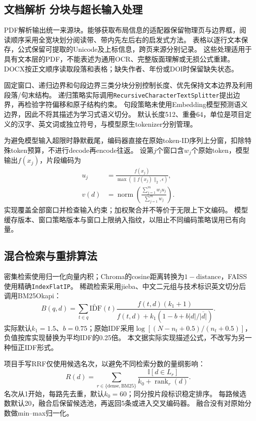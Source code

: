 \documentclass[UTF8,a4paper,zihao=-4,fontset=fandol]{ctexart}
\begin{document}
\subsection{文档解析 分块与超长输入处理}
PDF解析输出统一来源块。能够获取布局信息的适配器保留物理页与边界框，阅读顺序采用全宽块划分阅读带、带内先左后右的启发式方法。
表格以逐行文本保存，公式保留可提取的Unicode及上标信息，跨页来源分别记录。
这些处理适用于具有文本层的PDF，不能表述为通用OCR、完整版面理解或无损公式重建。
DOCX按正文顺序读取段落和表格；缺失作者、年份或DOI时保留缺失状态。

固定窗口、递归边界和句段边界三类分块分别控制长度、优先保持文本边界及利用段落/句末结构。
递归策略实际调用\texttt{RecursiveCharacterTextSplitter}提出边界，再检验字符偏移和原子结构约束。
句段策略未使用Embedding模型预测语义边界，因此不将其描述为学习式语义切分。
默认长度512、重叠64，单位是项目定义的汉字、英文词或独立符号，与模型原生tokenizer分别管理。

为避免模型输入超限时静默截尾，编码器直接在原始token-ID序列上分窗，扣除特殊token预算，不进行decode再encode往返。
设第$j$个窗口含$w_j$个原始token，模型输出$f(x_j)$，片段编码为
\begin{align}
 u_j&=\frac{f(x_j)}{\max(\lVert f(x_j)\rVert_2,\epsilon)},\\
 v(d)&=\operatorname{norm}\!\left(\frac{\sum_{j=1}^{m}w_ju_j}{\sum_{j=1}^{m}w_j}\right).
\end{align}
实现覆盖全部窗口并检查输入约束；加权聚合并不等价于无限上下文编码。
模型缓存版本、窗口策略版本与窗口上限纳入指纹，以阻止不同编码策略误用已有向量。

\subsection{混合检索与重排算法}
密集检索使用归一化向量内积；Chroma的cosine距离转换为$1-\mathrm{distance}$，FAISS使用精确\texttt{IndexFlatIP}。
稀疏检索采用jieba、中文二元组与技术标识英文切分后调用BM25Okapi\cite{bm25}：
\begin{equation}
 B(q,d)=\sum_{t\in q}\widetilde{\mathrm{IDF}}(t)
 \frac{f(t,d)(k_1+1)}{f(t,d)+k_1(1-b+b|d|/\overline{|d|})}.
\end{equation}
实际默认$k_1=1.5$、$b=0.75$；原始IDF采用$\log[(N-n_t+0.5)/(n_t+0.5)]$，负值按库实现替换为平均IDF的0.25倍。
本文据实际实现描述公式，不改写为另一种恒正IDF形式。

项目手写RRF仅使用候选名次，以避免不同检索分数的量纲影响\cite{rrf}：
\begin{equation}
 R(d)=\sum_{r\in\{\mathrm{dense},\mathrm{BM25}\}}
 \frac{\mathbb{I}[d\in L_r]}{k_0+\operatorname{rank}_r(d)}.
\end{equation}
名次从1开始，每路先去重，默认$k_0=60$；同分按片段标识稳定排序。
每路候选数默认20，融合后保留候选池，再返回5条或进入交叉编码器。
融合没有对原始分数做min--max归一化。
\end{document}
